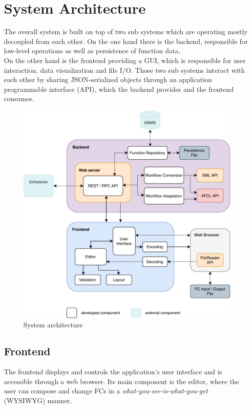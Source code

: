 \documentclass[a4paper,top=25mm,bottom=25mm,12pt,pdftex,halfparskip,twoside,openany,bibtotoc,numbers=noenddot]{scrbook}
\begin{document}
\section{System Architecture}
\label{sec:afcl-toolkit-architecture}

The overall system is built on top of two sub systems which are operating mostly decoupled from each other. On the one hand there is the backend, responsible for low-level operations as well as persistence of function data.\\
On the other hand is the frontend providing a GUI, which is responsible for user interaction, data visualization and file I/O.
Those two sub systems interact with each other by sharing JSON-serialized objects through an application programmable interface (API), which the backend provides and the frontend consumes.

\begin{figure}
  \centering
  \includegraphics{architecture}
  \caption{System architecture}
  \label{fig:system-architecture}
\end{figure}

\subsection{Frontend}

The frontend displays and controls the application's user interface and is accessible through a web browser. Its main component is the editor, where the user can compose and change FCs in a \textit{what-you-see-is-what-you-get} (WYSIWYG) manner.
\end{document}
